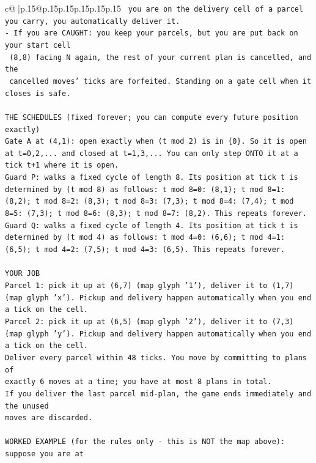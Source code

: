 \documentclass{article}
\begin{document}
{\begin{supertabular}{c@{$\;$}|p{.15\linewidth}@{}p{.15\linewidth}p{.15\linewidth}p{.15\linewidth}p{.15\linewidth}p{.15\linewidth}}
{{{\texttt{     you are on the delivery cell of a parcel you carry, you automatically deliver it.} \\
\texttt{{-} If you are CAUGHT: you keep your parcels, but you are put back on your start cell} \\
\texttt{  (8,8) facing N again, the rest of your current plan is cancelled, and the} \\
\texttt{  cancelled moves' ticks are forfeited. Standing on a gate cell when it closes is safe.} \\
\\ 
\texttt{THE SCHEDULES (fixed forever; you can compute every future position exactly)} \\
\texttt{Gate A at (4,1): open exactly when (t mod 2) is in \{0\}. So it is open at t=0,2,... and closed at t=1,3,... You can only step ONTO it at a tick t+1 where it is open.} \\
\texttt{Guard P: walks a fixed cycle of length 8. Its position at tick t is determined by (t mod 8) as follows: t mod 8=0: (8,1); t mod 8=1: (8,2); t mod 8=2: (8,3); t mod 8=3: (7,3); t mod 8=4: (7,4); t mod 8=5: (7,3); t mod 8=6: (8,3); t mod 8=7: (8,2). This repeats forever.} \\
\texttt{Guard Q: walks a fixed cycle of length 4. Its position at tick t is determined by (t mod 4) as follows: t mod 4=0: (6,6); t mod 4=1: (6,5); t mod 4=2: (7,5); t mod 4=3: (6,5). This repeats forever.} \\
\\ 
\texttt{YOUR JOB} \\
\texttt{Parcel 1: pick it up at (6,7) (map glyph '1'), deliver it to (1,7) (map glyph 'x'). Pickup and delivery happen automatically when you end a tick on the cell.} \\
\texttt{Parcel 2: pick it up at (6,5) (map glyph '2'), deliver it to (7,3) (map glyph 'y'). Pickup and delivery happen automatically when you end a tick on the cell.} \\
\texttt{Deliver every parcel within 48 ticks. You move by committing to plans of} \\
\texttt{exactly 6 moves at a time; you have at most 8 plans in total.} \\
\texttt{If you deliver the last parcel mid{-}plan, the game ends immediately and the unused} \\
\texttt{moves are discarded.} \\
\\ 
\texttt{WORKED EXAMPLE (for the rules only {-} this is NOT the map above): suppose you are at} \\
}}}
\end{supertabular}}
\end{document}
